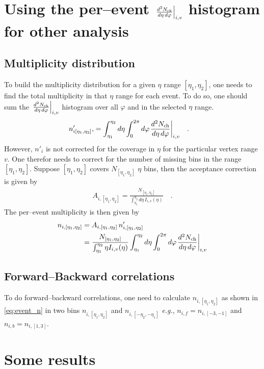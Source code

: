 \documentclass[11pt]{article}
\begin{document}
\section{Using the per--event $\dndetadphi[i,v]$ histogram for other
  analysis} 

\subsection{Multiplicity distribution} 

To build the multiplicity distribution for a given $\eta$ range
$[\eta_1,\eta_2]$, one needs to find the total multiplicity in that
$\eta$ range for each event. To do so, one should sum the
$\dndetadphi[i,v]$ histogram over all $\varphi$ and in the selected
$\eta$ range.
\begin{align}
  n'_{i[\eta_1,\eta_2]}, &= \int_{\eta_1}^{\eta_2}d\eta\int_0^{2\pi}d\varphi
  \dndetadphi[i,v]\quad.\nonumber
\end{align}
However, $n'_i$ is not corrected for the coverage in $\eta$ for the
particular vertex range $v$.  One therefor needs to correct for the
number of missing bins in the range $[\eta_1,\eta_2]$.  Suppose
$[\eta_1,\eta_2]$ covers $N_{[\eta_1,\eta_2]}$ $\eta$ bins, then the acceptance
correction is given by 
\begin{align}
  A_{i,[\eta_1,\eta_2]} = \frac{N_{[\eta_1,\eta_2]}}{\int_{\eta_1}^{\eta_2}d\eta\,
    I_{i,v}(\eta)}\quad.\nonumber
\end{align}
The per--event multiplicity is then given by 
\begin{align}
  n_{i,[\eta_1,\eta_2]} &= A_{i,[\eta_1,\eta_2]}\,n'_{i,[\eta_1,\eta_2]}\nonumber\\
  &= \frac{N_{[\eta_1,\eta_2]}}{\int_{\eta_1}^{\eta_2}\eta
    I_{i,v}(\eta)} \int_{\eta_1}^{\eta_2}d\eta\int_0^{2\pi}d\varphi
  \dndetadphi[i,v]
  \label{eq:event_n}
\end{align}

\subsection{Forward--Backward correlations} 

To do forward--backward correlations, one need to calculate
$n_{i,[\eta_1,\eta_2]}$ as shown in \eqref{eq:event_n} in two bins
$n_{i,[\eta_1,\eta_2]}$ and $n_{i,[-\eta_2,-\eta_1]}$ \textit{e.g.},
$n_{i,f}=n_{i,[-3,-1]}$ and $n_{i,b}=n_{i,[1,3]}$. 

\clearpage
\section{Some results}
\end{document}
